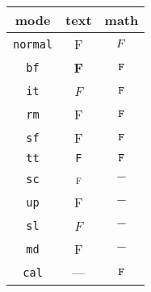 \documentclass{unittest}
\begin{document}
\begin{tabular}{ccc}
\toprule
mode & text & math \\
\midrule
\verb|normal| & \textnormal{F}  & $\mathnormal{F}$ \\
\verb|bf|     & \textbf{F}      & $\mathbf
\mathit
\mathrm
\mathsf
\mathtt{F}$     \\
\verb|it|     & \textit{F}      & $\mathbf
\mathit
\mathrm
\mathsf
\mathtt{F}$     \\
\verb|rm|     & \textrm{F}      & $\mathbf
\mathit
\mathrm
\mathsf
\mathtt{F}$     \\
\verb|sf|     & \textsf{F}      & $\mathbf
\mathit
\mathrm
\mathsf
\mathtt{F}$     \\
\verb|tt|     & \texttt{F}      & $\mathbf
\mathit
\mathrm
\mathsf
\mathtt{F}$     \\
\verb|sc|     & \textsc{f}      & $-$              \\
\verb|up|     & \textup{F}      & $-$              \\
\verb|sl|     & \textsl{F}      & $-$              \\
\verb|md|     & \textmd{F}      & $-$              \\
\verb|cal|    & ---             & $\mathbf
\mathit
\mathrm
\mathsf
\mathtt{F}$    \\
\bottomrule
\end{tabular}

\end{document}
